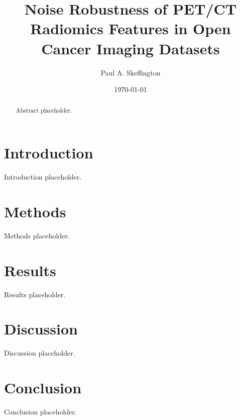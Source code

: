 \documentclass[11pt]{article}
\title{Noise Robustness of PET/CT Radiomics Features in Open Cancer Imaging Datasets}
\author{Paul A. Skeffington}
\date{\today}
\begin{document}
\maketitle

\begin{abstract}
Abstract placeholder.
\end{abstract}

\section{Introduction}
Introduction placeholder.

\section{Methods}
Methods placeholder.

\section{Results}
Results placeholder.

\section{Discussion}
Discussion placeholder.

\section{Conclusion}
Conclusion placeholder.
\end{document}

